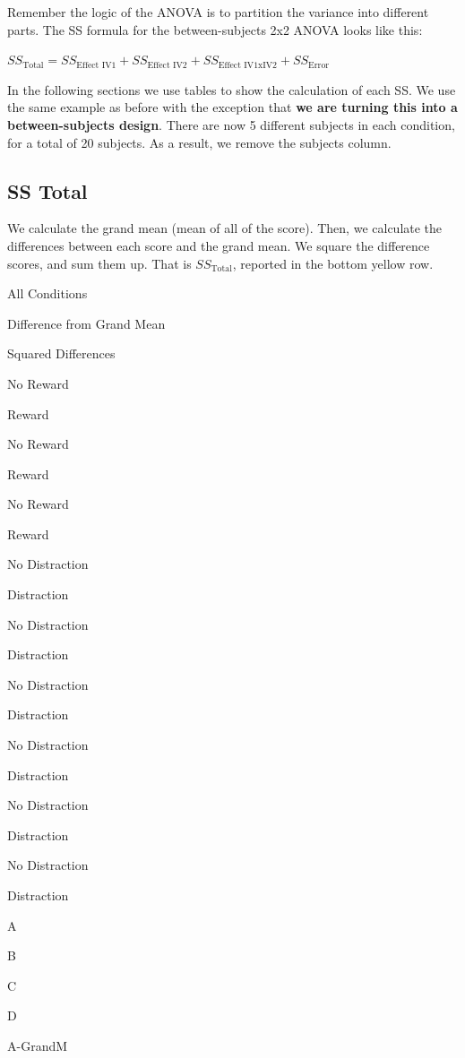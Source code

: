 \documentclass[
]{book}
\begin{document}
Remember the logic of the ANOVA is to partition the variance into different parts. The SS formula for the between-subjects 2x2 ANOVA looks like this:

\(SS_\text{Total} = SS_\text{Effect IV1} + SS_\text{Effect IV2} + SS_\text{Effect IV1xIV2} + SS_\text{Error}\)

In the following sections we use tables to show the calculation of each SS. We use the same example as before with the exception that \textbf{we are turning this into a between-subjects design}. There are now 5 different subjects in each condition, for a total of 20 subjects. As a result, we remove the subjects column.

\hypertarget{ss-total}{%
\subsection{SS Total}\label{ss-total}}

We calculate the grand mean (mean of all of the score). Then, we calculate the differences between each score and the grand mean. We square the difference scores, and sum them up. That is \(SS_\text{Total}\), reported in the bottom yellow row.

All Conditions

Difference from Grand Mean

Squared Differences

No Reward

Reward

No Reward

Reward

No Reward

Reward

No Distraction

Distraction

No Distraction

Distraction

No Distraction

Distraction

No Distraction

Distraction

No Distraction

Distraction

No Distraction

Distraction

A

B

C

D

A-GrandM
\end{document}
